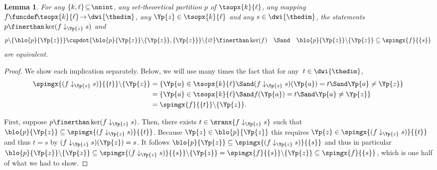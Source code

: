 \documentclass[pdftex]{sigma}
\numberwithin{equation}{section}
\newtheorem{Lemma}[Theorem]{Lemma}
\begin{document}
{
  \newcommand{\inlen}{k}
  \newcommand{\outlen}{\ell}
  \newcommand{\theind}{f}
  \newcommand{\thepoint}{\Yp{z}}
  \newcommand{\thevalue}{s}
  \newcommand{\thepartition}{p}
  \newcommand{\thealtered}{\theind\downarrow_\thepoint\thevalue}
  \newcommand{\anypoint}{\Yp{a}}
  \newcommand{\theblock}{\blo{\thepartition}{\thepoint}}
  \newcommand{\cutblock}{\blo{\thepartition}{\thepoint}\backslash \{\thepoint\}}
  \newcommand{\sing}{\{\thepoint\}}
  \begin{Lemma}
    \label{lemma:easy-cohomology-helper-one-point-replacer}
    For any $\{\inlen,\outlen\}\!\subseteq\! \nnint$, any set-theo\-re\-ti\-cal partition $\thepartition$ of $\tsopx{\inlen}{\outlen}$, any mapping ${\theind\funcdef\!\tsopx{\inlen}{\outlen}\!\to\! \dwi{\thedim}}$, any $\thepoint\in\tsopx{\inlen}{\outlen}$ and any $\thevalue\in\dwi{\thedim}$,
    the statements $ \thepartition\finerthan\ker(\thealtered)$ and
    \[
\thepartition\backslash \{\theblock\}\cupdot \{\cutblock,\sing\}\backslash \{\varnothing\}\finerthan \ker(\theind)\quad\Sand\quad \cutblock\subseteq \spimgx{\theind}{\{\thevalue\}}
\]
are equivalent.
  \end{Lemma}
  \begin{proof}
    \newcommand{\somevalue}{t}
    \newcommand{\othervalue}{t'}
    \newcommand{\someblock}{\Yb{B}}
    We show each implication separately. Below, we will use many times the fact that for any~${\somevalue \in \dwi{\thedim}}$,
    \begin{align*}
      \spimgx{(\thealtered)}{\{\somevalue\}}\backslash \{\thepoint\}&{}=\{\anypoint\in\tsopx{\inlen}{\outlen}\Sand (\thealtered)(\anypoint)=\somevalue\Sand \anypoint\neq\thepoint \}\\
      &{}=\{\anypoint\in\tsopx{\inlen}{\outlen}\Sand \theind(\anypoint)=\somevalue\Sand \anypoint\neq\thepoint \}\\
    &{}=\spimgx{\theind}{\{\somevalue\}}\backslash \{\thepoint\}.
    \end{align*}

    First, suppose $\thepartition\finerthan\ker(\thealtered)$. Then, there exists $\somevalue\in\sranx{\thealtered}$ such that $\theblock\subseteq \spimgx{(\thealtered)}{\{\somevalue\}}$. Because $\thepoint\in\theblock$ this requires $\thepoint\in \spimgx{(\thealtered)}{\{\somevalue\}}$ and thus $\somevalue=\thevalue$ by ${(\thealtered)(\thepoint)=\thevalue}$. It follows $\theblock\subseteq \spimgx{(\thealtered)}{\{\thevalue\}}$ and thus in particular $\cutblock\subseteq \spimgx{(\thealtered)}{\{\thevalue\}}\backslash \sing=\spimgx{\theind}{\{\thevalue\}}\backslash \{\thepoint\}\subseteq \spimgx{\theind}{\{\thevalue\}}$, which is one half of what we had to show.


\end{proof}}
\end{document}
